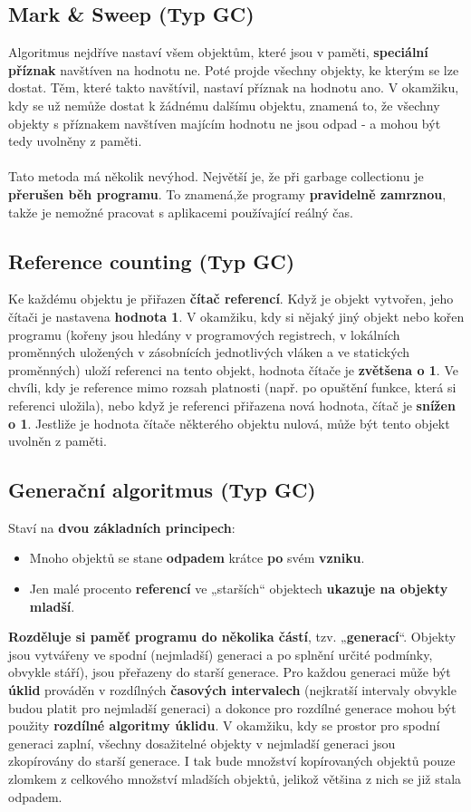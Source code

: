 \subsection{Mark \& Sweep (Typ GC)}
Algoritmus nejdříve nastaví všem objektům, které jsou v paměti, \textbf{speciální příznak} navštíven na hodnotu ne. Poté projde všechny objekty, ke kterým se lze dostat. Těm, které takto navštívil, nastaví příznak na hodnotu ano. V okamžiku, kdy se už nemůže dostat k žádnému dalšímu objektu, znamená to, že všechny objekty s příznakem navštíven majícím hodnotu ne jsou odpad - a mohou být tedy uvolněny z paměti.
\\\\
Tato metoda má několik nevýhod. Největší je, že při garbage collectionu je \textbf{přerušen běh programu}. To znamená,že programy \textbf{pravidelně zamrznou}, takže je nemožné pracovat s aplikacemi používající reálný čas.

\subsection{Reference counting (Typ GC)}
Ke každému objektu je přiřazen \textbf{čítač referencí}. Když je objekt vytvořen, jeho čítači je nastavena \textbf{hodnota 1}. V okamžiku, kdy si nějaký jiný objekt nebo kořen programu (kořeny jsou hledány v programových registrech, v lokálních proměnných uložených v zásobnících jednotlivých vláken a ve statických proměnných) uloží referenci na tento objekt, hodnota čítače je \textbf{zvětšena o 1}. Ve chvíli, kdy je reference mimo rozsah platnosti (např. po opuštění funkce, která si referenci uložila), nebo když je referenci přiřazena nová hodnota, čítač je \textbf{snížen o 1}. Jestliže je hodnota čítače některého objektu nulová, může být tento objekt uvolněn z paměti.

\subsection{Generační algoritmus (Typ GC)}
Staví na \textbf{dvou základních principech}:
\begin{itemize}
\item Mnoho objektů se stane \textbf{odpadem} krátce \textbf{po} svém \textbf{vzniku}.
\item Jen malé procento \textbf{referencí} ve „starších“ objektech \textbf{ukazuje na objekty mladší}.
\end{itemize}
\textbf{Rozděluje si paměť programu do několika částí}, tzv. „\textbf{generací}“. Objekty jsou vytvářeny ve spodní (nejmladší) generaci a po splnění určité podmínky, obvykle stáří), jsou přeřazeny do starší generace. Pro každou generaci může být \textbf{úklid} prováděn v rozdílných \textbf{časových intervalech }(nejkratší intervaly obvykle budou platit pro nejmladší generaci) a dokonce pro rozdílné generace mohou být použity \textbf{rozdílné algoritmy úklidu}. V okamžiku, kdy se prostor pro spodní generaci zaplní, všechny dosažitelné objekty v nejmladší generaci jsou zkopírovány do starší generace. I tak bude množství kopírovaných objektů pouze zlomkem z celkového množství mladších objektů, jelikož většina z nich se již stala odpadem.

